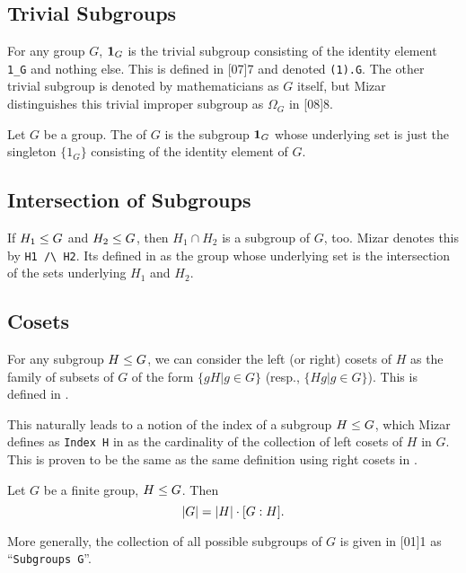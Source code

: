 \subsection{Trivial Subgroups}
For any group $G$, $\mathbf{1}_{G}$ is the trivial subgroup
consisting of the identity element \lstinline{1_G} and nothing else. This is
defined in [07]{7} and denoted \lstinline{(1).G}. The other
trivial subgroup is denoted by mathematicians as $G$ itself, but Mizar
distinguishes this trivial improper subgroup as $\Omega_{G}$ in
[08]{8}.

\begin{definition}
Let $G$ be a group.
The  of $G$ is the subgroup
$\mathbf{1}_{G}$ whose underlying set is just the singleton $\{1_{G}\}$
consisting of the identity element of $G$.
\end{definition}

\subsection{Intersection of Subgroups}
If $H_{1}\leq G$ and $H_{2}\leq G$, then $H_{1}\cap H_{2}$ is
a subgroup of $G$, too. Mizar denotes this by
\lstinline{H1 /\ H2}. Its
defined in  as the group whose
underlying set is the intersection of the sets underlying $H_{1}$ and $H_{2}$.

\subsection{Cosets}
For any subgroup $H\leq G$, we can consider the left (or right)
cosets of $H$ as the family of subsets of $G$ of the form
$\{gH|g\in G\}$ (resp., $\{Hg|g\in G\}$). This is defined in
.

This naturally leads to a notion of the index of a subgroup $H\leq G$,
which Mizar defines as \lstinline{Index H} in
 as the
cardinality of the collection of left cosets of $H$ in $G$. This is
proven to be the same as the same definition using right cosets in
.

\begin{theorem}
  Let $G$ be a finite group, $H\leq G$. Then
  \begin{equation}
|G| = |H|\cdot[G : H].
  \end{equation}
\end{theorem}

More generally, the collection of all possible subgroups of $G$ is given
in [01]{1} as
``\lstinline{Subgroups G}''.

